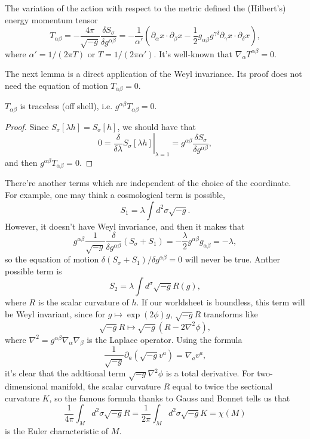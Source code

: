 The variation of the action with respect to the metric
defined the (Hilbert's) energy momentum tensor
\[
	T_{\alpha\beta}=-\frac{4\pi}{\sqrt{-g}}
	\frac{\delta S_\sigma}{\delta g^{\alpha\beta}}=
	-\frac{1}{\alpha'}\left(
	\partial_\alpha x\cdot \partial_\beta x-
	\frac 12 g_{\alpha\beta}g^{\gamma\delta}
	\partial_\gamma x\cdot \partial_\delta x
	\right),
\]
where $\alpha'=1/(2\pi T)$ or $T=1/(2\pi \alpha')$. 
It's well-known that $\nabla_\alpha T^{\alpha \beta}=0$.

The next lemma is a direct application of the Weyl invariance.
Its proof does not need the equation of motion $T_{\alpha\beta}=0$.

\begin{lem}
	$T_{\alpha\beta}$ is traceless (off shell), i.e. $g^{\alpha\beta}T_{\alpha\beta}=0$.
\end{lem}

\begin{proof}
	Since $S_\sigma[\lambda h]=S_\sigma[h]$, we should have that
	\[
		0=\left.\frac{\delta}{\delta \lambda}S_\sigma[\lambda h]
		\right |_{\lambda=1}
		=g^{\alpha\beta}\frac{\delta S_\sigma}{\delta g^{\alpha\beta}},
	\]
	and then $g^{\alpha\beta}T_{\alpha\beta}=0$.
\end{proof}


There're another terms which are independent of the choice
of the coordinate. For example, one may think a cosmological
term is possible,
\[
	S_1=\lambda \int d^2\sigma \sqrt{-g}.
\]
However, it doesn't have Weyl invariance, and then it 
makes that
\[
	g^{\alpha\beta}\frac{1}{\sqrt{-g}}
	\frac{\delta}{\delta g^{\alpha\beta}} (S_\sigma+S_1)=
	-\frac{\lambda}{2}g^{\alpha\beta}g_{\alpha\beta}=-\lambda,
\]
so the equation of motion 
$\delta (S_\sigma+S_1)/\delta g^{\alpha\beta}=0$ will never 
be true. Anther possible term is 
\[
	S_2=\lambda \int d^\sigma \sqrt{-g} R(g),
\]
where $R$ is the scalar curvature of $h$. 
If our worldsheet is boundless, this term will be Weyl 
invariant, since for $g\mapsto \exp(2\phi)g$, $\sqrt{-g}R$ 
transforms like
\[
\sqrt{-g}R\longmapsto \sqrt{-g}(R-2\nabla^2 \phi),
\]
where $\nabla^2=g^{\alpha\beta}\nabla_\alpha\nabla_\beta$
is the Laplace operator. Using the formula
\[
	\frac{1}{\sqrt{-g}}\partial_a (\sqrt{-g}v^a)=\nabla_a v^a,
\]
it's clear that the addtional term $\sqrt{-g}\nabla^2 \phi$
is a total derivative. For two-dimensional manifold, the
scalar curvature $R$ equal to twice the sectional curvature 
$K$, so the famous formula thanks to Gauss and Bonnet 
tells us that
\[
	\frac{1}{4\pi}\int_M d^2\sigma \sqrt{-g} R
	=\frac{1}{2\pi}\int_M d^2\sigma \sqrt{-g} K=
	\chi (M)
\]
is the Euler characteristic of $M$.

